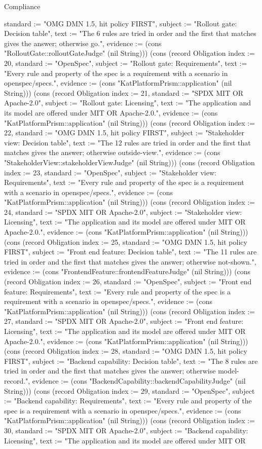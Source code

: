 \begin{lexlean}{Compliance}
\begin{semanticmodule}
{standard := "OMG DMN 1.5, hit policy FIRST", subject := "Rollout gate: Decision table", text := "The 6 rules are tried in order and the first that matches gives the answer; otherwise go.", evidence := (cons "RolloutGate::rolloutGateJudge" (nil String))}) (cons (record Obligation {index := 20, standard := "OpenSpec", subject := "Rollout gate: Requirements", text := "Every rule and property of the spec is a requirement with a scenario in openspec/specs.", evidence := (cons "KatPlatformPrism::application" (nil String))}) (cons (record Obligation {index := 21, standard := "SPDX MIT OR Apache-2.0", subject := "Rollout gate: Licensing", text := "The application and its model are offered under MIT OR Apache-2.0.", evidence := (cons "KatPlatformPrism::application" (nil String))}) (cons (record Obligation {index := 22, standard := "OMG DMN 1.5, hit policy FIRST", subject := "Stakeholder view: Decision table", text := "The 12 rules are tried in order and the first that matches gives the answer; otherwise outside-view.", evidence := (cons "StakeholderView::stakeholderViewJudge" (nil String))}) (cons (record Obligation {index := 23, standard := "OpenSpec", subject := "Stakeholder view: Requirements", text := "Every rule and property of the spec is a requirement with a scenario in openspec/specs.", evidence := (cons "KatPlatformPrism::application" (nil String))}) (cons (record Obligation {index := 24, standard := "SPDX MIT OR Apache-2.0", subject := "Stakeholder view: Licensing", text := "The application and its model are offered under MIT OR Apache-2.0.", evidence := (cons "KatPlatformPrism::application" (nil String))}) (cons (record Obligation {index := 25, standard := "OMG DMN 1.5, hit policy FIRST", subject := "Front end feature: Decision table", text := "The 11 rules are tried in order and the first that matches gives the answer; otherwise not-shown.", evidence := (cons "FrontendFeature::frontendFeatureJudge" (nil String))}) (cons (record Obligation {index := 26, standard := "OpenSpec", subject := "Front end feature: Requirements", text := "Every rule and property of the spec is a requirement with a scenario in openspec/specs.", evidence := (cons "KatPlatformPrism::application" (nil String))}) (cons (record Obligation {index := 27, standard := "SPDX MIT OR Apache-2.0", subject := "Front end feature: Licensing", text := "The application and its model are offered under MIT OR Apache-2.0.", evidence := (cons "KatPlatformPrism::application" (nil String))}) (cons (record Obligation {index := 28, standard := "OMG DMN 1.5, hit policy FIRST", subject := "Backend capability: Decision table", text := "The 8 rules are tried in order and the first that matches gives the answer; otherwise model-record.", evidence := (cons "BackendCapability::backendCapabilityJudge" (nil String))}) (cons (record Obligation {index := 29, standard := "OpenSpec", subject := "Backend capability: Requirements", text := "Every rule and property of the spec is a requirement with a scenario in openspec/specs.", evidence := (cons "KatPlatformPrism::application" (nil String))}) (cons (record Obligation {index := 30, standard := "SPDX MIT OR Apache-2.0", subject := "Backend capability: Licensing", text := "The application and its model are offered under MIT OR }
\end{semanticmodule}
\end{lexlean}
